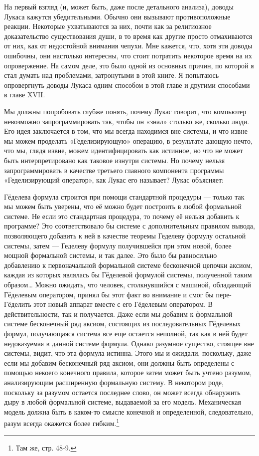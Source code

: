 \documentclass[../main.tex]{subfiles}
\begin{document}
На первый взгляд (и, может быть, даже после детального анализа), доводы Лукаса кажутся убедительными. Обычно они вызывают противоположные реакции. Некоторые ухватываются за них, почти как за религиозное доказательство существования души, в то время как другие просто отмахиваются от них, как от недостойной внимания чепухи. Мне кажется, что, хотя эти доводы ошибочны, они настолько интересны, что стоит потратить некоторое время на их опровержение. На самом деле, это было одной из основных причин, по которой я стал думать над проблемами, затронутыми в этой книге. Я попытаюсь опровергнуть доводы Лукаса одним способом в этой главе и другими способами в главе XVII.

Мы должны попробовать глубже понять, почему Лукас говорит, что компьютер невозможно запрограммировать так, чтобы он «знал» столько же, сколько люди. Его идея заключается в том, что мы всегда находимся вне системы, и что извне мы можем проделать «Геделизирующую» операцию, в результате дающую нечто, что мы, глядя извне, можем идентифицировать как истинное, но что не может быть интерпретировано как таковое изнутри системы. Но почему нельзя запрограммировать в качестве третьего главного компонента программы «Геделизирующий оператор», как Лукас его называет? Лукас объясняет:

Гёделева формула строится при помощи стандартной процедуры --- только так мы можем быть уверены, что её можно будет построить в любой формальной системе. Не если это стандартная процедура, то почему её нельзя добавить к программе? Это соответствовало бы системе с дополнительным правилом вывода, позволяющего добавить к ней в качестве теоремы Геделеву формулу остальной системы, затем --- Геделеву формулу получившейся при этом новой, более мощной формальной системы, и так далее. Это было бы равносильно добавлению к первоначальной формальной системе бесконечной цепочки аксиом, каждая из которых являлась бы Гёделевой формулой системы, полученной таким образом\ldots{} Можно ожидать, что человек, столкнувшийся с машиной, обладающий Гёделевым оператором, принял бы этот факт во внимание и смог бы пере-Гёделить этот новый аппарат вместе с его Гёделевым оператором. В действительности, так и получается. Даже если мы добавим к формальной системе бесконечный ряд аксиом, состоящих из последовательных Гёделевых формул, получающаяся система все еще остается неполной, так как в ней будет недоказуемая в данной системе формула. Однако разумное существо, стоящее вне системы, видит, что эта формула истинна. Этого мы и ожидали, поскольку, даже если мы добавим бесконечный ряд аксиом, они должны быть определены с помощью некоего конечного правила, которое затем может быть учтено разумом, анализирующим расширенную формальную систему. В некотором роде, поскольку за разумом остается последнее слово, он может всегда обнаружить дыру в любой формальной системе, выдаваемой за его модель. Механическая модель должна быть в каком-то смысле конечной и определенной, следовательно, разум всегда окажется более гибким.\footnote{Там же, стр. 48-9.}
\end{document}
